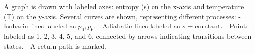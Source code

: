 A graph is drawn with labeled axes: entropy (s) on the x-axis and temperature (T) on the y-axis. Several curves are shown, representing different processes:  
- Isobaric lines labeled as \( p_0, p_6 \).  
- Adiabatic lines labeled as \( s = \text{constant} \).  
- Points labeled as 1, 2, 3, 4, 5, and 6, connected by arrows indicating transitions between states.  
- A return path is marked.